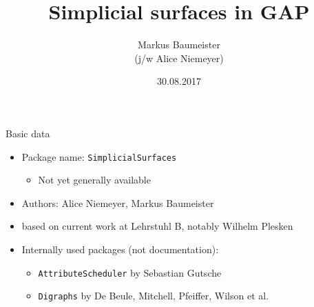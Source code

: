 \documentclass[11pt, handout]{beamer}
\author[Baumeister]{Markus Baumeister\\ \vspace{1mm} \small{(j/w Alice Niemeyer)}}
\title{Simplicial surfaces in GAP}
\institute[Aachen]{Lehrstuhl B für Mathematik\\RWTH Aachen University}
\date{30.08.2017}
\begin{document}
\begin{frame}
\titlepage
\end{frame}

\begin{frame}{Basic data}
    \begin{itemize}
        \pause
        \item Package name: \texttt{SimplicialSurfaces}
            \begin{itemize}
                \pause
                \item Not yet generally available
            \end{itemize}
        \pause
        \item Authors: Alice Niemeyer, Markus Baumeister
        \pause
        \item based on current work at Lehrstuhl B, notably Wilhelm Plesken
        \pause
        \item Internally used packages (not documentation):
            \begin{itemize}
                \pause
                \item \texttt{AttributeScheduler} by Sebastian Gutsche
                \pause
                \item \texttt{Digraphs} by De Beule, Mitchell, Pfeiffer, Wilson et al.
            \end{itemize}
    \end{itemize}
\end{frame}
\end{document}
